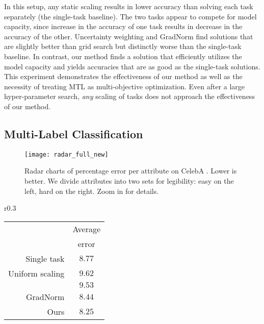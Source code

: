 In this setup, any static scaling results in lower accuracy than solving each task separately (the single-task baseline). The two tasks appear to compete for model capacity, since increase in the accuracy of one task results in decrease in the accuracy of the other. Uncertainty weighting \citep{Kendall2018} and GradNorm \citep{Chen2018} find solutions that are slightly better than grid search but distinctly worse than the single-task baseline. In contrast, our method finds a solution that efficiently utilizes the model capacity and yields accuracies that are as good as the single-task solutions. This experiment demonstrates the effectiveness of our method as well as the necessity of treating MTL as multi-objective optimization. Even after a large hyper-parameter search, \emph{any} scaling of tasks does not approach the effectiveness of our method.



\subsection{Multi-Label Classification}

\begin{figure}[t]
\texttt{[image: radar\_full\_new]}
\vspace{1mm}
\caption{Radar charts of percentage error per attribute on CelebA \citep{celeba}. Lower is better. We divide attributes into two sets for legibility: easy on the left, hard on the right. Zoom in for details.}
\label{fig:multi_label_radar}
\end{figure}


\begin{wraptable}{r}{0.3\textwidth}
\begin{tabular}{r@{\hspace{2mm}}c@{}}
\toprule
& Average  \\
&  error \\
\midrule
Single task & $8.77$ \\
Uniform scaling & $9.62$ \\
\citealt{Kendall2018} & $9.53$ \\
GradNorm & $8.44$ \\
Ours & $\mathbf{8.25}$  \\
\bottomrule
\end{tabular}
\label{table:multi_label_bar}
\end{wraptable}

